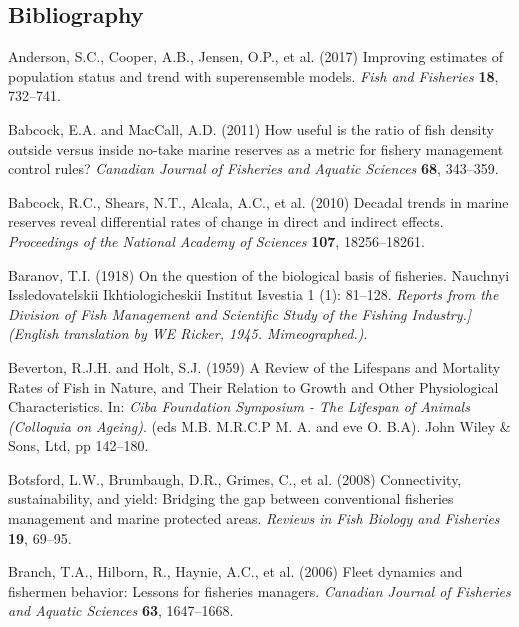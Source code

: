 \documentclass[twoside,12pt,final]{ucthesis-CA2012}
\begin{document}
\begin{ucmainmatter}
\chapter*{Bibliography}\label{bibliography}


\noindent

\setlength{\parindent}{-0.20in} \setlength{\leftskip}{0.20in}
\setlength{\parskip}{8pt}

\hypertarget{refs}{}
\hypertarget{ref-Anderson2017b}{}
Anderson, S.C., Cooper, A.B., Jensen, O.P., et al. (2017) Improving
estimates of population status and trend with superensemble models.
\emph{Fish and Fisheries} \textbf{18}, 732--741.

\hypertarget{ref-Babcock2011}{}
Babcock, E.A. and MacCall, A.D. (2011) How useful is the ratio of fish
density outside versus inside no-take marine reserves as a metric for
fishery management control rules? \emph{Canadian Journal of Fisheries
and Aquatic Sciences} \textbf{68}, 343--359.

\hypertarget{ref-Babcock2010}{}
Babcock, R.C., Shears, N.T., Alcala, A.C., et al. (2010) Decadal trends
in marine reserves reveal differential rates of change in direct and
indirect effects. \emph{Proceedings of the National Academy of Sciences}
\textbf{107}, 18256--18261.

\hypertarget{ref-Baranov1918}{}
Baranov, T.I. (1918) On the question of the biological basis of
fisheries. Nauchnyi Issledovatelskii Ikhtiologicheskii Institut Isvestia
1 (1): 81--128. \emph{Reports from the Division of Fish Management and
Scientific Study of the Fishing Industry.{]}(English translation by WE
Ricker, 1945. Mimeographed.)}.

\hypertarget{ref-Beverton1959}{}
Beverton, R.J.H. and Holt, S.J. (1959) A Review of the Lifespans and
Mortality Rates of Fish in Nature, and Their Relation to Growth and
Other Physiological Characteristics. In: \emph{Ciba Foundation Symposium
- The Lifespan of Animals (Colloquia on Ageing)}. (eds M.B. M.R.C.P M.
A. and eve O. B.A). John Wiley \& Sons, Ltd, pp 142--180.

\hypertarget{ref-Botsford2008}{}
Botsford, L.W., Brumbaugh, D.R., Grimes, C., et al. (2008) Connectivity,
sustainability, and yield: Bridging the gap between conventional
fisheries management and marine protected areas. \emph{Reviews in Fish
Biology and Fisheries} \textbf{19}, 69--95.

\hypertarget{ref-Branch2006}{}
Branch, T.A., Hilborn, R., Haynie, A.C., et al. (2006) Fleet dynamics
and fishermen behavior: Lessons for fisheries managers. \emph{Canadian
Journal of Fisheries and Aquatic Sciences} \textbf{63}, 1647--1668.


\end{ucmainmatter}
\end{document}
